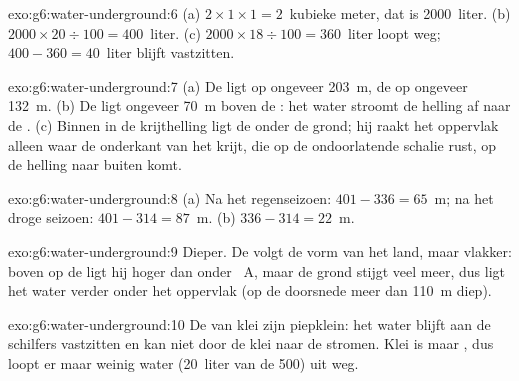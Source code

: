\begin{solution}{exo:g6:water-underground:6}
(a) $2 \times 1 \times 1 = 2$~kubieke meter, dat is 2000~liter.
(b) $2000 \times 20 \div 100 = 400$~liter. (c) $2000 \times 18 \div 100 =
360$~liter loopt weg; $400 - 360 = 40$~liter blijft vastzitten.
\end{solution}

\begin{solution}{exo:g6:water-underground:7}
(a) De  ligt op ongeveer 203~m, de  op ongeveer 132~m. (b) De
 ligt ongeveer 70~m boven de : het water stroomt de helling af
naar de . (c) Binnen in de krijthelling ligt de 
onder de grond; hij raakt het oppervlak alleen waar de onderkant van het
krijt, die op de ondoorlatende schalie rust, op de helling naar buiten
komt.
\end{solution}

\begin{solution}{exo:g6:water-underground:8}
(a) Na het regenseizoen: $401 - 336 = 65$~m; na het droge seizoen:
$401 - 314 = 87$~m. (b) $336 - 314 = 22$~m.
\end{solution}

\begin{solution}{exo:g6:water-underground:9}
Dieper. De  volgt de vorm van het land, maar vlakker:
boven op de  ligt hij hoger dan onder ~A, maar de grond stijgt
veel meer, dus ligt het water verder onder het oppervlak (op de doorsnede
meer dan 110~m diep).
\end{solution}

\begin{solution}{exo:g6:water-underground:10}
De  van klei zijn piepklein: het water blijft aan de schilfers
vastzitten en kan niet door de klei naar de  stromen. Klei is 
maar , dus loopt er maar weinig water (20~liter van de 500)
uit weg.
\end{solution}

